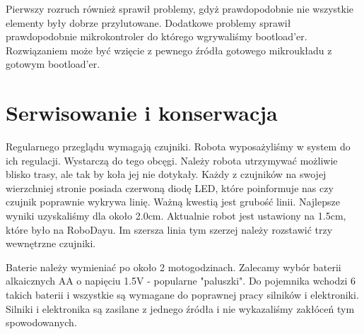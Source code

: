 \documentclass[a4paper,11pt]{article}
\begin{document}
Pierwszy rozruch również sprawił problemy, gdyż prawdopodobnie nie wszystkie elementy były dobrze przylutowane. Dodatkowe problemy sprawił prawdopodobnie mikrokontroler do którego wgrywaliśmy bootload'er. Rozwiązaniem może być wzięcie z pewnego źródła gotowego mikroukładu z gotowym bootload'er.
\section{Serwisowanie i konserwacja}
Regularnego przeglądu wymagają czujniki. Robota wyposażyliśmy w system do ich regulacji. Wystarczą do tego obcęgi. Należy robota utrzymywać możliwie blisko trasy, ale tak by koła jej nie dotykały. Każdy z czujników na swojej wierzchniej stronie posiada czerwoną diodę LED, które poinformuje nas czy czujnik poprawnie wykrywa linię. Ważną kwestią jest grubość linii. Najlepsze wyniki uzyskaliśmy dla około 2.0cm. Aktualnie robot jest ustawiony na 1.5cm, które było na RoboDayu. Im szersza linia tym szerzej należy rozstawić trzy wewnętrzne czujniki.

Baterie należy wymieniać po około 2 motogodzinach. Zalecamy wybór baterii alkaicznych AA o napięciu 1.5V - popularne "paluszki". Do pojemnika wchodzi 6 takich baterii i wszystkie są wymagane do poprawnej pracy silników i elektroniki. Silniki i elektronika są zasilane z jednego źródła i nie wykazaliśmy zakłóceń tym spowodowanych.
\end{document}
